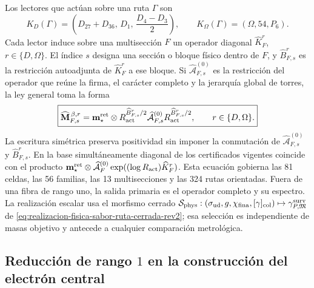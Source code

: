 Los lectores que actúan sobre una ruta \(\Gamma\) son
\begin{equation}
 K_D(\Gamma)
 =\left(D_{27}+D_{36},\,D_1,\,\frac{D_4-D_3}{2}\right),
 \qquad
 K_\Omega(\Gamma)=(\Omega,54,P_6).
 \label{eq:lectores-kd-komega-masas-rectoras}
\end{equation}
Cada lector induce sobre una multisección \(F\) un operador diagonal
\(\widehat K_F^r\), \(r\in\{D,\Omega\}\). El índice \(s\) designa una sección o
bloque físico dentro de \(F\), y \(\widehat B_{F,s}^r\) es la restricción
autoadjunta de \(\widehat K_F^r\) a ese bloque. Si
\(\widehat{\mathcal A}^{(0)}_{F,s}\) es la restricción del operador que reúne la
firma, el carácter completo y la jerarquía global de torres, la ley general toma
la forma
\begin{equation}
 \boxed{
 \widehat{\mathbf M}^{\,\beta,r}_{F,s}
 =\mathbf m_\star^{\rm ret}\otimes
  R_{\rm act}^{\widehat B_{F,s}^r/2}
  \widehat{\mathcal A}^{(0)}_{F,s}
  R_{\rm act}^{\widehat B_{F,s}^r/2},
 \qquad r\in\{D,\Omega\}.}
 \label{eq:ley-operatorial-general-masas-rectoras}
\end{equation}
La escritura simétrica preserva positividad sin imponer la conmutación de
\(\widehat{\mathcal A}^{(0)}_{F,s}\) y \(\widehat B_{F,s}^r\). En la base
simultáneamente diagonal de los certificados vigentes coincide con el producto
\(\mathbf m_\star^{\rm ret}\otimes\widehat{\mathcal A}^{(0)}_F
\exp((\log R_{\rm act})\widehat K_F^r)\).
Esta ecuación gobierna las 81 celdas, las 56 familias, las 13 multisecciones y las
324 rutas orientadas. Fuera de una fibra de rango uno, la salida primaria es el
operador completo y su espectro. La realización escalar usa el morfismo cerrado
\(\mathcal S_{\rm phys}:(\sigma_{\rm ud},g,\chi_{\rm fina},[\gamma]_{\rm col})
\mapsto\gamma^{\rm surv}_{P,\mathfrak M}\) de
\cref{eq:realizacion-fisica-sabor-ruta-cerrada-rev2}; esa selección es
independiente de masas objetivo y antecede a cualquier comparación metrológica.

\subsection{Reducción de rango \(1\) en la construcción del electrón central}

